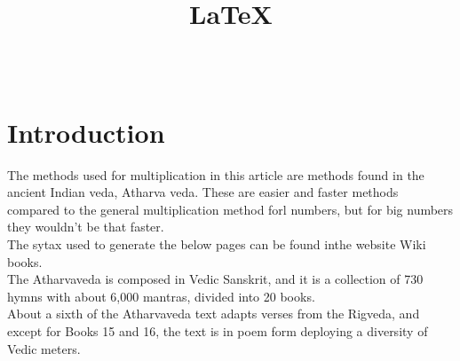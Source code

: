 \documentclass[12pt,a4paper]{article}
\title{\LaTeX}
\author{
	\hspace{4in}{Dheeraj Athrey}\\
}
\begin{document}
\maketitle


\section*{Introduction}


The methods used for multiplication in this article are methods found in the ancient Indian veda, Atharva veda\cite{bloomfield1899atharvaveda}\cite{India1000shaping}. These are easier and faster methods compared to the general multiplication method forl numbers, but for big numbers they wouldn't be that faster.\\
The sytax used to generate the below pages can be found inthe website Wiki books\cite{website:Wikibooks}.\\


The Atharvaveda is composed in Vedic Sanskrit, and it is a collection of 730 hymns with about 6,000 mantras, divided into 20 books.\\
About a sixth of the Atharvaveda text adapts verses from the Rigveda, and except for Books 15 and 16, the text is in poem form deploying a diversity of Vedic meters.\\





\end{document}
